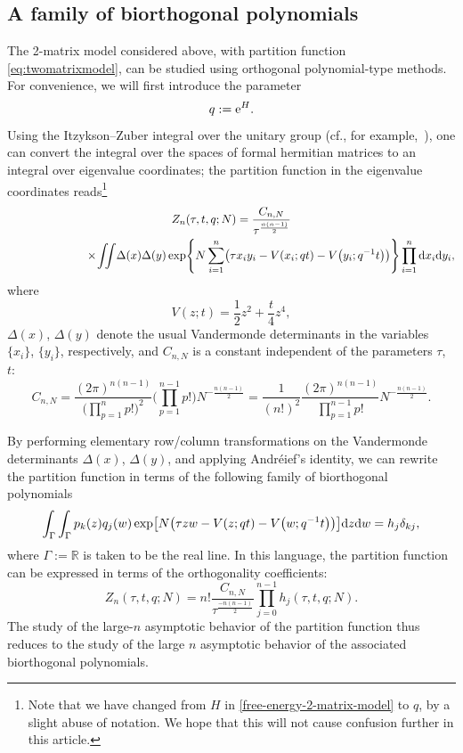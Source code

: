 \documentclass[pdftex]{sigma}
\numberwithin{equation}{section}
\begin{document}
\subsection{A family of biorthogonal polynomials}
The 2-matrix model considered above, with partition function \eqref{eq:twomatrixmodel}, can be studied using orthogonal polynomial-type methods. For convenience, we will first introduce the parameter
 \begin{equation} \label{eq:qeH}
 q := {\rm e}^H.
 \end{equation}
Using the Itzykson--Zuber integral over the unitary group (cf., for example,~\cite{IZ,Mehta,ZJZ}), one can convert the integral over the spaces of formal hermitian
matrices to an integral over eigenvalue coordinates; the partition function in the eigenvalue coordinates reads\footnote{Note that we have changed from $H$ in \eqref{free-energy-2-matrix-model} to $q$, by a slight abuse of notation. We hope that this will not cause confusion further in this article.}
 \begin{gather*} %
 Z_{n}(\tau,t,q;N) = \frac{C_{n,N}}{\tau^{\frac{n(n-1)}{2}}} \\
 \hphantom{Z_{n}(\tau,t,q;N) =}{}\times\!
 \iint\! \Delta(x) \Delta(y) \exp\Biggl\{ N\sum_{i=1}^n \bigl(\tau x_iy_i - V(x_i;q t) - V\bigl(y_i;q^{-1}t\bigr) \bigr)\Biggr\}\prod_{i=1}^n {\rm d}x_i {\rm d}y_i,
 \end{gather*}
where
\begin{equation*}
 V(z;t) = \frac{1}{2}z^2 + \frac{t}{4} z^4,
\end{equation*}
$\Delta(x)$, $\Delta(y)$ denote the usual Vandermonde determinants in the variables $\{x_i\}$, $\{y_i\}$, respectively, and $C_{n,N}$ is a constant independent of the parameters $\tau$,~$t$:
 \begin{equation*}
 C_{n,N} = \frac{(2\pi)^{n(n-1)}}{\bigl(\prod_{p=1}^n p!\bigr)^2} \Biggl(\prod_{p=1}^{n-1} p!\Biggr) N^{-\frac{n(n-1)}{2}}
 = \frac{1}{(n!)^2}\frac{(2\pi)^{n(n-1)}}{\prod_{p=1}^{n-1} p!}N^{-\frac{n(n-1)}{2}}.
 \end{equation*}

By performing elementary row/column transformations on the Vandermonde determinants $\Delta(x)$, $\Delta(y)$, and applying Andr\'eief's identity, we can rewrite the partition function in terms of the following family of biorthogonal polynomials~\cite{Mehta}
 \begin{equation} \label{biorthogonal-polynomials}
 \int_\Gamma \int_{\Gamma} p_k(z)q_j(w)\exp \bigl[ N\bigl(\tau z w - V(z;q t) - V\bigl(w;q^{-1}t\bigr) \bigr)\bigr] {\rm d}z {\rm d}w = h_j \delta_{kj},
 \end{equation}
where $\Gamma := \mathbb{R}$ is taken to be the real line.
In this language, the partition function can be expressed in terms of the orthogonality coefficients:
 \begin{equation}\label{partition-function-orthogonality-coeff}
 Z_{n}(\tau,t,q;N) = n!\frac{C_{n,N}}{\tau^{\frac{-n(n-1)}{2}}}\prod_{j=0}^{n-1} h_j(\tau,t,q;N).
 \end{equation}
 The study of the large-$n$ asymptotic behavior of the partition function thus reduces to the study of the large $n$ asymptotic behavior of the associated biorthogonal polynomials.
\end{document}
